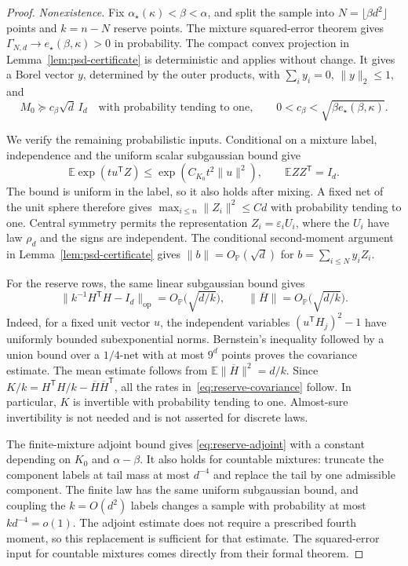 \documentclass[11pt]{article}
\newcommand{\Pbb}{\mathbb P}
\newcommand{\E}{\mathbb E}
\newcommand{\opnorm}[1]{\lVert#1\rVert_{\mathrm{op}}}
\newcommand{\norm}[1]{\lVert#1\rVert}
\newcommand{\OP}{O_{\Pbb}}
\theoremstyle{remark}
\begin{document}
\begin{proof}
\emph{Nonexistence.}
Fix $\alpha_\star(\kappa)<\beta<\alpha$, and split the sample into
$N=\lfloor\beta d^2\rfloor$ points and $k=n-N$ reserve points.
The mixture squared-error theorem gives
$\Gamma_{N,d}\to e_\star(\beta,\kappa)>0$ in probability. The compact
convex projection in Lemma~\ref{lem:psd-certificate} is deterministic
and applies without change. It gives a Borel vector $y$, determined
by the outer products, with $\sum_i y_i=0$, $\norm y_2\le1$, and
\[
 M_0\succeq c_\beta\sqrt d\,I_d
 \quad\text{with probability tending to one},\qquad
 0<c_\beta<\sqrt{\beta e_\star(\beta,\kappa)}.
\]

We verify the remaining probabilistic inputs. Conditional on a mixture
label, independence and the uniform scalar subgaussian bound give
\[
 \E\exp(tu^{\mathsf T}Z)\le
       \exp(C_{K_0}t^2\norm u^2),\qquad
 \E ZZ^{\mathsf T}=I_d.
\]
The bound is uniform in the label, so it also holds after mixing.
A fixed net of the unit sphere therefore gives
$\max_{i\le n}\norm{Z_i}^2\le C d$ with probability tending to one.
Central symmetry permits the representation $Z_i=\varepsilon_iU_i$,
where the $U_i$ have law $\rho_d$ and the signs are independent.
The conditional second-moment argument in
Lemma~\ref{lem:psd-certificate} gives $\norm b=\OP(\sqrt d)$ for
$b=\sum_{i\le N}y_iZ_i$.

For the reserve rows, the same linear subgaussian bound gives
\[
 \opnorm{k^{-1}H^{\mathsf T}H-I_d}
       =\OP\big(\sqrt{d/k}\big),\qquad
 \norm{\overline H}=\OP\big(\sqrt{d/k}\big).
\]
Indeed, for a fixed unit vector $u$, the independent variables
$(u^{\mathsf T}H_j)^2-1$ have uniformly bounded subexponential norms.
Bernstein's inequality followed by a union bound over a $1/4$-net
with at most $9^d$ points proves the covariance estimate. The mean
estimate follows from $\E\norm{\overline H}^2=d/k$.
Since
$K/k=H^{\mathsf T}H/k-\overline H\overline H^{\mathsf T}$,
all the rates in~\eqref{eq:reserve-covariance} follow. In particular,
$K$ is invertible with probability tending to one. Almost-sure
invertibility is not needed and is not asserted for discrete laws.

The finite-mixture adjoint bound  gives
\eqref{eq:reserve-adjoint} with a constant depending on $K_0$ and
$\alpha-\beta$. It also holds for countable mixtures: truncate the
component labels at tail mass at most $d^{-4}$ and replace the tail
by one admissible component. The finite law has the same uniform
subgaussian bound, and coupling the $k=O(d^2)$ labels changes a sample
with probability at most $kd^{-4}=o(1)$. The adjoint estimate does not
require a prescribed fourth moment, so this replacement is sufficient
for that estimate. The squared-error input for countable mixtures
comes directly from their formal theorem.


\end{proof}
\end{document}
